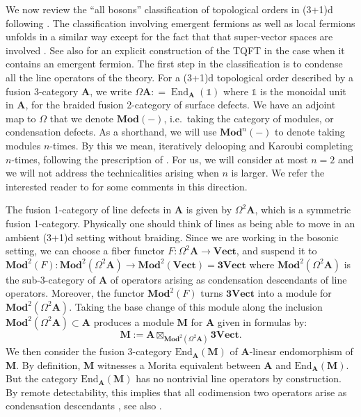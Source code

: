 \documentclass[11pt,reqno]{amsart}
\DeclareMathOperator{\End}{End}
\newcommand{\Mod}{\mathbf{Mod}}
\newcommand{\Vect}{\mathbf{Vect}}
\numberwithin{equation}{section}
\theoremstyle{plain}
\theoremstyle{definition}
\begin{document}
We now review the ``all bosons'' classification of topological orders in (3+1)d following \cite{Lan_2018}. The classification involving emergent fermions as well as local fermions unfolds in a similar way except for the fact that that super-vector spaces are involved \cite{Lan_2019,JF}. See also \cite{Thorngren:2020aph} for an explicit construction of the TQFT in the case when it contains an emergent fermion. The first step in the classification is to condense all the line operators of the theory.
For a (3+1)d topological order described by a fusion $3$-category $\mathbf{A}$, we write $\Omega \mathbf{A}: = \End_{\mathbf{A}}(\mathds{1})$ where $\mathds{1}$ is the monoidal unit in $\mathbf{A}$, for the braided fusion 2-category of surface defects. We have an adjoint map to $\Omega$ that we denote $\Mod(-)$, i.e.\ taking the category of modules, or condensation defects. As a shorthand, we will use $\Mod^n(-)$ to denote taking modules $n$-times. By this we mean, iteratively delooping and Karoubi completing $n$-times, following the prescription of \cite{Gaiotto:2019xmp,JF}. For us, we will consider at most $n=2$ and we will not address the technicalities arising when $n$ is larger. We refer the interested reader to \cite{Bhardwaj:2024xcx} for some comments in this direction.

The fusion 1-category of line defects in $\mathbf{A}$ is given by $\Omega^2\mathbf{A}$, which is a symmetric fusion 1-category. Physically one should think of lines as being able to move in an ambient (3+1)d setting without braiding. Since we are working in the bosonic setting, we can choose a fiber functor $F: \Omega^2\mathbf{A} \rightarrow \Vect$, and suspend it to $\Mod^2(F): \Mod^2(\Omega^2 \mathbf{A})\rightarrow \Mod^2 (\Vect) = \mathbf{3Vect}$ where $\Mod^2(\Omega^2 \mathbf{A})$ is the sub-3-category of $\mathbf{A}$ of operators arising as condensation descendants of line operators. Moreover, the functor $\Mod^2(F)$ turns $\mathbf{3Vect}$ into a module for $\Mod ^2(\Omega^2\mathbf{A})$. Taking the base change of this module along the inclusion $\Mod ^2(\Omega^2\mathbf{A}) \subset \mathbf{A}$ produces a module $\mathbf{M}$ for $\mathbf{A}$ given in formulas by:
\begin{equation}
    \mathbf{M} := \mathbf{A} \boxtimes_{\Mod^2 (\Omega^2\mathbf{A})} \mathbf{3Vect}.
\end{equation}
We then consider the fusion 3-category $\mathrm{End}_{\mathbf{A}}(\mathbf{M})$ of $\mathbf{A}$-linear endomorphism of $\mathbf{M}$. By definition, $\mathbf{M}$ witnesses a Morita equivalent between $\mathbf{A}$ and $\mathrm{End}_{\mathbf{A}}(\mathbf{M})$. But the category $\mathrm{End}_{\mathbf{A}}(\mathbf{M})$ has no nontrivial line operators by construction. By remote detectability, this implies that all codimension two operators arise as condensation descendants \cite{JF}, see also \cite{Lan_2018,Lan_2019}. 
\end{document}
